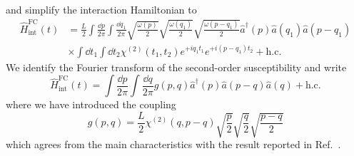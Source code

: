 and simplify the interaction Hamiltonian to
\begin{equation}
	\begin{split}
		\hat{H}_\text{int}^\text{FC}(t)
		&=
		\frac{L}{2}
		\int\frac{\dd{p}}{2\pi}
		\int\frac{\dd{q_1}}{2\pi}
		\sqrt{\frac{\omega(p)}{2}}
		\sqrt{\frac{\omega(q_1)}{2}}
		\sqrt{\frac{\omega(p-q_1)}{2}}
		\hat{a}^\dagger(p)
		\hat{a}(q_1)
		\hat{a}(p-q_1)
		\\
		&\times
		\int\dd{t_1}
		\int\dd{t_2}
		\chi^{(2)}(t_1,t_2)
		e^{+iq_1t_1}
		e^{+i(p-q_1)t_2}
		+
		\text{h.c.}
	\end{split}
\end{equation}
We identify the Fourier transform of the second-order susceptibility and write
\begin{equation}
	\hat{H}_\text{int}^\text{FC}(t)
	=
	\int\frac{\dd{p}}{2\pi}
	\int\frac{\dd{q}}{2\pi}
	g(p,q)
	\hat{a}^\dagger(p)
	\hat{a}(p-q)
	\hat{a}(q)
	+
	\text{h.c.}
\end{equation}
where we have introduced the coupling
\begin{equation}
	g(p,q)
	=
	\frac{L}{2}
	\chi^{(2)}(q,p-q)
	\sqrt{\frac{p}{2}}
	\sqrt{\frac{q}{2}}
	\sqrt{\frac{p-q}{2}}
\end{equation}
which agrees from the main characteristics with the result reported in Ref.~\cite[eq.~35]{Horoshko2018}.